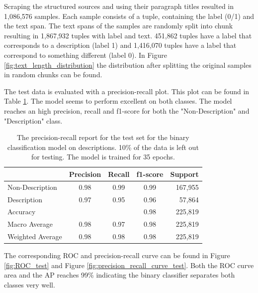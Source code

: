\documentclass[a4paper, 12pt, oneside]{book} %
\begin{document}
Scraping the structured sources and using their paragraph titles resulted in 1,086,576 samples.
Each sample consists of a tuple, containing the label (0/1) and the text span.
The text spans of the samples are randomly split into chunk resulting in 1,867,932 tuples with label and text.
451,862 tuples have a label that corresponds to a description (label 1) and 1,416,070 tuples have a label that correspond to something different (label 0).
In Figure \ref{fig:text_length_distribution} the distribution after splitting the original samples in random chunks can be found.

The test data is evaluated with a precision-recall plot.
This plot can be found in Table \ref{tab:precision_recall_descriptionsmodel}.
The model seems to perform excellent on both classes.
The model reaches an high precision, recall and f1-score for both the "Non-Description" and "Description" class.

\begin{table}[h]
\centering
\caption[Precision-recall report for test data]{The precision-recall report for the test set for the binary classification model on descriptions. 10\% of the data is left out for testing. The model is trained for 35 epochs.}
\label{tab:precision_recall_descriptionsmodel}
\begin{tabular}{@{}lcccr@{}}
\cmidrule(l){2-5}
 & \multicolumn{1}{l}{Precision} & \multicolumn{1}{l}{Recall} & \multicolumn{1}{l}{f1-score} & \multicolumn{1}{l}{Support} \\ \midrule
Non-Description  & 0.98 & 0.99 & 0.99 & 167,955 \\
Description      & 0.97 & 0.95 & 0.96 & 57,864  \\ \midrule
Accuracy         &      &      & 0.98 & 225,819 \\
Macro Average    & 0.98 & 0.97 & 0.98 & 225,819 \\
Weighted Average & 0.98 & 0.98 & 0.98 & 225,819 \\ \bottomrule
\end{tabular}
\end{table}

\noindent
The corresponding ROC and precision-recall curve can be found in Figure \ref{fig:ROC_test} and Figure \ref{fig:precision_recall_curve_test}.
Both the ROC curve area and the AP reaches 99\% indicating the binary classifier separates both classes very well.
\end{document}
